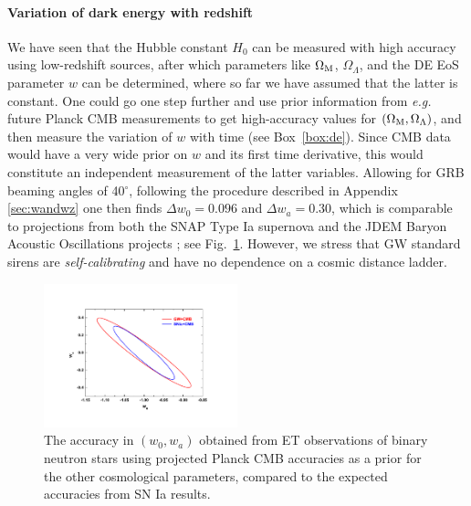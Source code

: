 \paragraph{Variation of dark energy with redshift}
We have seen that the Hubble constant $H_0$ can be measured with high
accuracy using low-redshift sources, after which parameters like $\Omega_{\rm M}$,
$\Omega_\Lambda$, and the DE EoS parameter $w$ can
be determined, where so far we have assumed that the latter is constant. One could
go one step further and use prior information from
{\em e.g.} future Planck CMB measurements to get high-accuracy values for
$(\Omega_{\rm M}, \Omega_\Lambda)$, and then measure the variation of $w$ with
time (see Box~\ref{box:de}). Since CMB data would have a very wide prior on $w$ and its first time derivative,
this would constitute an independent measurement of the latter variables.
%
Allowing for GRB beaming angles of 40$^\circ$, following the procedure
described in Appendix \ref{sec:wandwz} one then finds 
$\Delta w_0 = 0.096$ and $\Delta w_a = 0.30$, which
is comparable to projections from both the SNAP Type Ia supernova and the JDEM Baryon Acoustic Oscillations projects \cite{Zhao:2010}; see Fig.~\ref{fig:cosmofigs}. However, we stress that GW standard sirens are \emph{self-calibrating} and have no dependence on a cosmic distance ladder.


\begin{figure}[h]
\centering
\includegraphics[width=0.5\textwidth]{./Sec_ET_ScienceCase/fc2.pdf}
\vskip -0.4cm
\caption{The accuracy in $(w_0,w_a)$ obtained from ET observations of binary neutron stars using projected Planck CMB accuracies as a prior for the other cosmological parameters, compared to the expected accuracies from SN Ia results.}
\label{fig:cosmofigs}
\end{figure}

